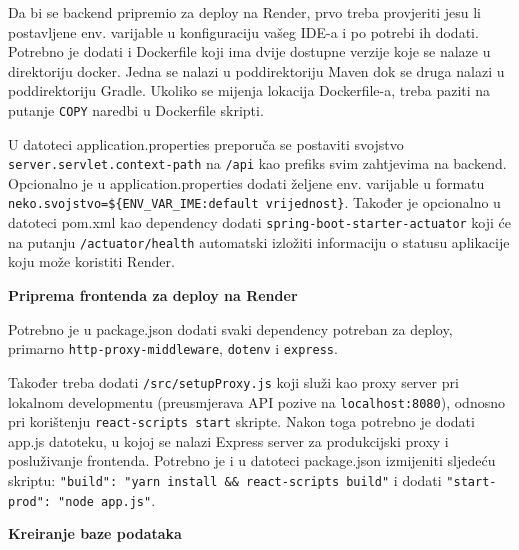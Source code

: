 			Da bi se backend pripremio za deploy na Render, prvo treba provjeriti jesu li postavljene env. varijable u konfiguraciju vašeg IDE-a i po potrebi ih dodati. Potrebno je dodati i Dockerfile koji ima dvije dostupne verzije koje se nalaze u direktoriju docker. Jedna se nalazi u poddirektoriju Maven dok se druga nalazi u poddirektoriju Gradle. Ukoliko se mijenja lokacija Dockerfile-a, treba paziti na putanje \texttt{COPY} naredbi u Dockerfile skripti.\par
U datoteci application.properties preporuča se postaviti svojstvo \texttt{server.\allowbreak servlet.\allowbreak context-path} na \texttt{/api} kao prefiks svim zahtjevima na backend. Opcionalno je u application.properties dodati željene env. varijable u formatu
\texttt{neko.svojstvo=\allowbreak\$\{ENV\_VAR\_IME:\allowbreak default vrijednost\}}. Također je opcionalno u datoteci pom.xml kao dependency dodati \texttt{spring-boot-\allowbreak starter-actuator} koji će na putanju \texttt{/actuator/health} automatski izložiti informaciju o statusu aplikacije koju može koristiti Render. \hfill \break

		\noindent \textbf{Priprema frontenda za deploy na Render}

	Potrebno je u package.json dodati svaki dependency potreban za deploy, primarno \texttt{http-proxy-\allowbreak middleware}, \texttt{dotenv} i \texttt{express}. \par
	Također treba dodati \texttt{/src/setupProxy.js} koji služi kao proxy server pri lokalnom developmentu (preusmjerava API pozive na \texttt{localhost:8080}), odnosno pri  korištenju \texttt{react-scripts start} skripte. Nakon toga potrebno je dodati app.js datoteku, u kojoj se nalazi Express server za produkcijski proxy i posluživanje frontenda. Potrebno je i u datoteci package.json izmijeniti sljedeću skriptu: \texttt{"build": "yarn install \&\& react-scripts build"} i dodati \texttt{"start-prod": "node app.js"}.

		\noindent \textbf{Kreiranje baze podataka}


